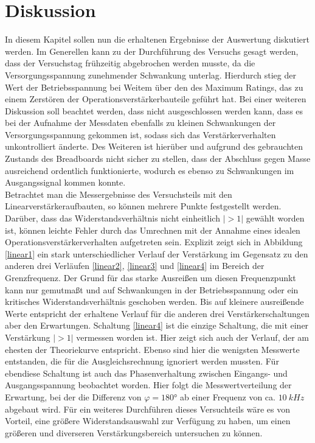 \section{Diskussion}
In diesem Kapitel sollen nun die erhaltenen Ergebnisse der Auswertung diskutiert werden.
Im Generellen kann zu der Durchführung des Versuchs gesagt werden, dass der Versuchstag frühzeitig abgebrochen werden musste, da die Versorgungsspannung zunehmender Schwankung unterlag. Hierdurch stieg der Wert der Betriebsspannung bei Weitem über den des Maximum Ratings, das zu einem Zerstören der Operationsverstärkerbauteile geführt hat.
Bei einer weiteren Diskussion soll beachtet werden, dass nicht ausgeschlossen werden kann, dass es bei der Aufnahme der Messdaten ebenfalls zu kleinen Schwankungen der Versorgungsspannung gekommen ist, sodass sich das Verstärkerverhalten unkontrolliert änderte. Des Weiteren ist hierüber und aufgrund des gebrauchten Zustands des Breadboards nicht sicher zu stellen, dass der Abschluss gegen Masse ausreichend ordentlich funktionierte, wodurch es ebenso zu Schwankungen im Ausgangssignal kommen konnte.\\
Betrachtet man die Messergebnisse des Versuchsteils mit den Linearverstärkeraufbauten, so können mehrere Punkte festgestellt werden. Darüber, dass das Widerstandsverhältnis nicht einheitlich $|>1|$ gewählt worden ist, können leichte Fehler durch das Umrechnen mit der Annahme eines idealen Operationsverstärkerverhalten aufgetreten sein.
Explizit zeigt sich in Abbildung \ref{linear1} ein stark unterschiedlicher Verlauf der Verstärkung im Gegensatz zu den anderen drei Verläufen \ref{linear2}, \ref{linear3} und \ref{linear4} im Bereich der Grenzfrequenz. Der Grund für das starke Ausreißen um diesen Frequenzpunkt kann nur gemutmaßt und auf Schwankungen in der Betriebsspannung oder ein kritisches Widerstandsverhältnis geschoben werden. Bis auf kleinere ausreißende Werte entspricht der erhaltene Verlauf für die anderen drei Verstärkerschaltungen aber den Erwartungen. Schaltung \ref{linear4} ist die einzige Schaltung, die mit einer Verstärkung $|>1|$ vermessen worden ist. Hier zeigt sich auch der Verlauf, der am ehesten der Theoriekurve entspricht. Ebenso sind hier die wenigsten Messwerte entstanden, die für die Ausgleichsrechnung ignoriert werden mussten.
Für ebendiese Schaltung ist auch das Phasenverhaltung zwischen Eingangs- und Ausgangsspannung beobachtet worden. Hier folgt die Messwertverteilung der Erwartung, bei der die Differenz von $\varphi=180°$ ab einer Frequenz von ca. $\SI{10}{kHz}$ abgebaut wird. Für ein weiteres Durchführen dieses Versuchteils wäre es von Vorteil, eine größere Widerstandsauswahl zur Verfügung zu haben, um einen größeren und diverseren Verstärkungsbereich untersuchen zu können.\\
